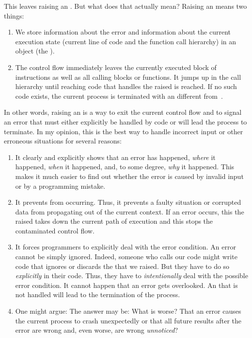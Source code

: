 This leaves raising an .
But what does that actually mean?
Raising an  means two things:%
%
\begin{enumerate}%
%
\item We store information about the error and information about the current execution state (current line of code and the function call hierarchy) in an object (the ).%
%
\item The control flow immediately leaves the currently executed block of instructions as well as all calling blocks or functions.
It jumps up in the call hierarchy until reaching code that handles the raised  is reached.
If no such code exists, the current process is terminated with an  different from~.%
%
\end{enumerate}%
%
In other words, raising an  is a way to exit the current control flow and to signal an error that must either explicitly be handled by code or will lead the process to terminate.
In my opinion, this is the best way to handle incorrect input or other erroneous situations for several reasons:%
%
\begin{enumerate}%
%
\item It clearly and explicitly shows that an error has happened, \emph{where} it happened, \emph{when} it happened, and, to some degree, \emph{why} it happened.
This makes it much easier to find out whether the error is caused by invalid input or by a programming mistake.%
%
\item It prevents  from occurring.
Thus, it prevents a faulty situation or corrupted data from propagating out of the current context.
If an error occurs, this the raised  takes down the current path of execution and this stops the contaminated control flow.%
%
\item It forces programmers to explicitly deal with the error condition.
An error cannot be simply ignored.
Indeed, someone who calls our code might write code that ignores or discards the  that we raised.
But they have to do so \emph{explicitly} in their code.
Thus, they have to \emph{intentionally} deal with the possible error condition.
It cannot happen that an error gets overlooked.
An  that is not handled will lead to the termination of the process.%
%
\item One might argue: 
The answer may be:
What is worse?
That an error causes the current process to crash unexpectedly or that all future results after the error are wrong and, even worse, are wrong \emph{unnoticed}?%
%
\end{enumerate}%
